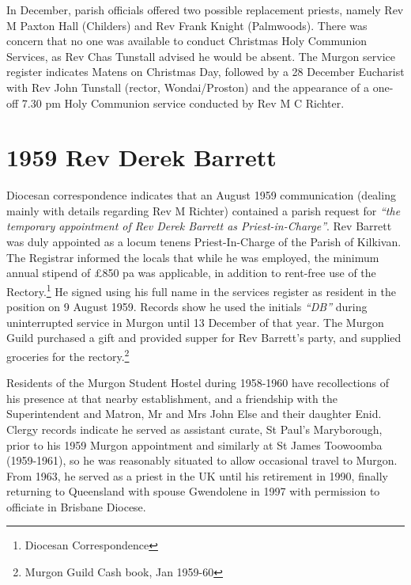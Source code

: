 In December, parish officials offered two possible replacement priests, namely Rev M Paxton Hall (Childers) and Rev Frank Knight (Palmwoods). There was concern that no one was available to conduct Christmas Holy Communion Services, as Rev Chas Tunstall advised he would be absent. The Murgon service register indicates Matens on Christmas Day, followed by a 28 December Eucharist with Rev John Tunstall (rector, Wondai/Proston) and the appearance of a one-off 7.30 pm Holy Communion service conducted by Rev M C Richter.



\section{1959 Rev Derek Barrett}



Diocesan correspondence indicates that an August 1959 communication (dealing mainly with details regarding Rev M Richter) contained a parish request for \emph{``the temporary appointment of Rev Derek Barrett as Priest-in-Charge''}. Rev Barrett was duly appointed as a locum tenens Priest-In-Charge of the Parish of Kilkivan. The Registrar informed the locals that while he was employed, the minimum annual stipend of \pounds850 pa was applicable, in addition to rent-free use of the Rectory.\footnote{Diocesan Correspondence} He signed using his full name in the services register as resident in the position on 9 August 1959. Records show he used the initials \emph{``DB''} during uninterrupted service in Murgon until 13 December of that year. The Murgon Guild purchased a gift and provided supper for Rev Barrett's party, and supplied groceries for the rectory.\footnote{Murgon Guild Cash book, Jan 1959-60}


Residents of the Murgon Student Hostel during 1958-1960 have recollections of his presence at that nearby establishment, and a friendship with the Superintendent and Matron, Mr and Mrs John Else and their daughter Enid. Clergy records indicate he served as assistant curate, St Paul's Maryborough, prior to his 1959 Murgon appointment and similarly at St James Toowoomba (1959-1961), so he was reasonably situated to allow occasional travel to Murgon. From 1963, he served as a priest in the UK until his retirement in 1990, finally returning to Queensland with spouse Gwendolene in 1997 with permission to officiate in Brisbane Diocese.



